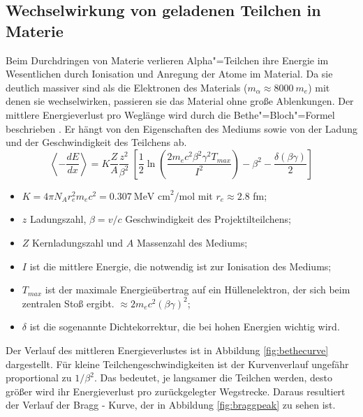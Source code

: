 \subsection{Wechselwirkung von geladenen Teilchen in Materie}
Beim Durchdringen von Materie verlieren Alpha"=Teilchen ihre Energie im Wesentlichen durch Ionisation und Anregung der Atome im Material. Da sie deutlich massiver sind als die Elektronen des Materials ($m_\alpha \approx 8000\ m_{e}$) mit denen sie wechselwirken, passieren sie das Material ohne große Ablenkungen. Der mittlere Energieverlust pro Weglänge wird durch die Bethe"=Bloch"=Formel beschrieben \cite{kolanoski}. Er hängt von den Eigenschaften des Mediums sowie von der Ladung und der Geschwindigkeit des Teilchens ab.
\begin{equation}
	\left\langle - \frac{dE}{dx} \right\rangle = K \frac{Z}{A} \frac{z^2}{\beta^2} \ \left[ \frac{1}{2} \ln \left( \frac{2 m_e c^2 \beta^2 \gamma^2 T_{max}}{I^2} \right) - \beta^2 - \frac{\delta(\beta\gamma)}{2} \right] 
\end{equation}
\begin{itemize}[itemsep=0pt, label=-]
	\item $K=4\pi N_A r_e^2 m_e c^2 = 0.307\ \text{MeV cm}^2 / \text{mol} $ mit $r_e \approx 2.8$ fm;
	\item $z$ Ladungszahl, $\beta = v / c$ Geschwindigkeit des Projektilteilchens;
	\item $Z$ Kernladungszahl und $A$ Massenzahl des Mediums;
	\item $I$ ist die mittlere Energie, die notwendig ist zur Ionisation des Mediums;
	\item $T_{max}$ ist der maximale Energieübertrag auf ein Hüllenelektron, der sich beim zentralen Stoß ergibt. $\approx 2 m_e c^2 (\beta\gamma)^2$;
	\item $\delta$ ist die sogenannte Dichtekorrektur, die bei hohen Energien wichtig wird.
\end{itemize}

Der Verlauf des mittleren Energieverlustes ist in Abbildung \ref{fig:bethecurve} dargestellt. Für kleine Teilchengeschwindigkeiten ist der Kurvenverlauf ungefähr proportional zu $1/\beta^2$. Das bedeutet, je langsamer die Teilchen werden, desto größer wird ihr Energieverlust pro zurückgelegter Wegstrecke. Daraus resultiert der Verlauf der Bragg - Kurve, der in Abbildung \ref{fig:braggpeak} zu sehen ist.

